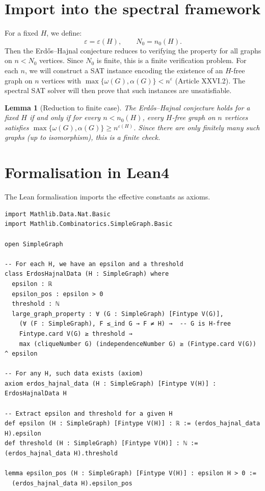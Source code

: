 \documentclass[11pt,a4paper]{article}
\newtheorem{lemma}[theorem]{Lemma}
\begin{document}
\section{Import into the spectral framework}
For a fixed $H$, we define:
\[
\varepsilon = \varepsilon(H), \qquad N_0 = n_0(H).
\]
Then the Erdős–Hajnal conjecture reduces to verifying the property for all graphs on $n < N_0$ vertices. Since $N_0$ is finite, this is a finite verification problem. For each $n$, we will construct a SAT instance encoding the existence of an $H$-free graph on $n$ vertices with $\max\{\omega(G),\alpha(G)\} < n^{\varepsilon}$ (Article XXVI.2). The spectral SAT solver will then prove that such instances are unsatisfiable.

\begin{lemma}[Reduction to finite case]\label{lem:reduction}
The Erdős–Hajnal conjecture holds for a fixed $H$ if and only if for every $n < n_0(H)$, every $H$-free graph on $n$ vertices satisfies $\max\{\omega(G),\alpha(G)\} \ge n^{\varepsilon(H)}$. Since there are only finitely many such graphs (up to isomorphism), this is a finite check.
\end{lemma}

\section{Formalisation in Lean4}
The Lean formalisation imports the effective constants as axioms.

\begin{lstlisting}[style=lean, caption={SeriesXXVI/ErdosHajnalConstants.lean (final)}]
import Mathlib.Data.Nat.Basic
import Mathlib.Combinatorics.SimpleGraph.Basic

open SimpleGraph

-- For each H, we have an epsilon and a threshold
class ErdosHajnalData (H : SimpleGraph) where
  epsilon : ℝ
  epsilon_pos : epsilon > 0
  threshold : ℕ
  large_graph_property : ∀ (G : SimpleGraph) [Fintype V(G)],
    (∀ (F : SimpleGraph), F ≤_ind G → F ≠ H) →  -- G is H-free
    Fintype.card V(G) ≥ threshold →
    max (cliqueNumber G) (independenceNumber G) ≥ (Fintype.card V(G)) ^ epsilon

-- For any H, such data exists (axiom)
axiom erdos_hajnal_data (H : SimpleGraph) [Fintype V(H)] : ErdosHajnalData H

-- Extract epsilon and threshold for a given H
def epsilon (H : SimpleGraph) [Fintype V(H)] : ℝ := (erdos_hajnal_data H).epsilon
def threshold (H : SimpleGraph) [Fintype V(H)] : ℕ := (erdos_hajnal_data H).threshold

lemma epsilon_pos (H : SimpleGraph) [Fintype V(H)] : epsilon H > 0 :=
  (erdos_hajnal_data H).epsilon_pos
\end{lstlisting}
\end{document}
